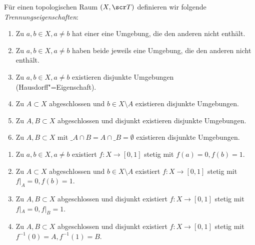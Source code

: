 \begin{df}[Trennungsaxiome] \label{df:separation_axioms}
	Für einen topologischen Raum $(X, \scr T)$ definieren wir folgende \emph{Trennungseigenschaften}:
	\begin{enumerate}[label=(\SepAxiom{\arabic*}),start=0,leftmargin=3.5em,series=sepaxioms]
		\item
			Zu $a, b \in X, a \neq b$ hat einer eine Umgebung, die den anderen nicht enthält.
		\item
			Zu $a, b \in X, a \neq b$ haben beide jeweils eine Umgebung, die den anderen nicht enthält.
		\item
			Zu $a, b \in X, a \neq b$ existieren disjunkte Umgebungen (Hausdorff"=Eigenschaft).
		\item
			Zu $A \subset X$ abgeschlossen und $b \in X \setminus A$ existieren disjunkte Umgebungen.
		\item
			Zu $A, B \subset X$ abgeschlossen und disjunkt existieren disjunkte Umgebungen.
		\item
			Zu $A, B \subset X$ mit $\_A \cap B = A \cap \_B = \emptyset$ existieren disjunkte Umgebungen.
	\end{enumerate}
	\begin{enumerate}[label=(\SepAxiom{\arabic*\sfrac12}),resume*=sepaxioms,start=2]
		\item
			Zu $a, b \in X, a \neq b$ existiert $f: X \to [0,1]$ stetig mit $f(a) = 0, f(b) = 1$.
		\item
			Zu $A \subset X$ abgeschlossen und $b \in X \setminus A$ existiert $f: X \to [0,1]$ stetig mit $f|_A = 0, f(b) = 1$.
		\item
			Zu $A, B \subset X$ abgeschlossen und disjunkt existiert $f: X \to [0,1]$ stetig mit $f|_A = 0, f|_B = 1$.
		\item
			Zu $A, B \subset X$ abgeschlossen und disjunkt existiert $f: X \to [0,1]$ stetig mit $f^{-1}(0) = A, f^{-1}(1) = B$.
	\end{enumerate}
\end{df}

